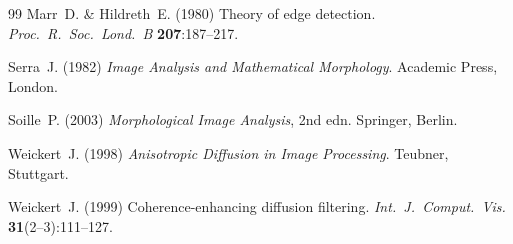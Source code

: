 \documentclass[a4paper, justified]{tufte-book}
\begin{document}
\begin{thebibliography}{99}
Marr~D. \& Hildreth~E. (1980)
Theory of edge detection.
\textit{Proc.\ R.\ Soc.\ Lond.\ B} \textbf{207}:187--217.

Serra~J. (1982)
\textit{Image Analysis and Mathematical Morphology}.
Academic Press, London.

Soille~P. (2003)
\textit{Morphological Image Analysis}, 2nd edn.
Springer, Berlin.

Weickert~J. (1998)
\textit{Anisotropic Diffusion in Image Processing}.
Teubner, Stuttgart.

Weickert~J. (1999)
Coherence-enhancing diffusion filtering.
\textit{Int.\ J.\ Comput.\ Vis.} \textbf{31}(2--3):111--127.

\end{thebibliography}
\end{document}
